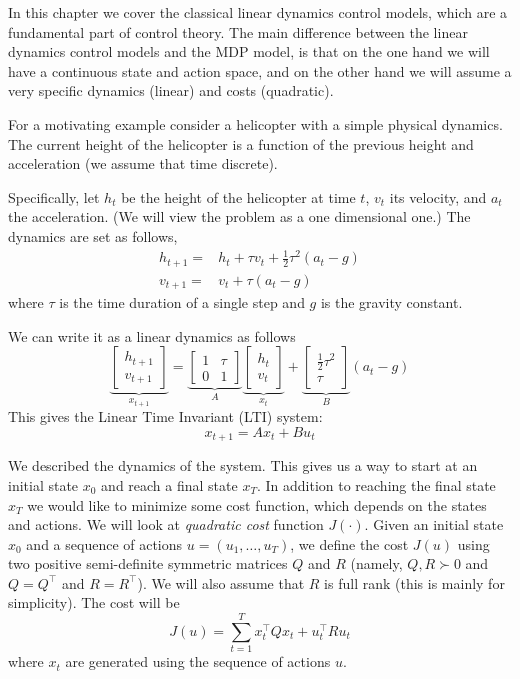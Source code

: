 In this chapter we cover the classical linear dynamics control models, which are a fundamental part of control theory. The main difference between the linear dynamics control models and the MDP model, is that on the one hand we will have a continuous state and action space, and on the other hand we will assume a very specific dynamics (linear) and costs (quadratic).

For a motivating example consider a helicopter with a simple
physical dynamics. The current height of the helicopter is a
function of the previous height and acceleration (we assume that time
discrete).

Specifically, let $h_t$ be the height of the helicopter at time $t$,
$v_t$ its velocity, and $a_t$ the acceleration. (We will view the
problem as a one dimensional one.) The dynamics are set as follows,
\begin{align*}
h_{t+1} =& h_t +\tau v_t +\frac{1}{2} \tau^2(a_t-g)\\
v_{t+1} = & v_t +\tau (a_t-g)
\end{align*}
where $\tau$ is the time duration of a single step and $g$ is the gravity constant.

We can write it as a linear dynamics as follows
\[
\underbrace{
\begin{bmatrix}
h_{t+1}\\
v_{t+1}
\end{bmatrix}}_{x_{t+1}}
= \underbrace{
\begin{bmatrix}
1&\tau\\
0&1
\end{bmatrix}
}_A
\underbrace{
\begin{bmatrix}
h_{t}\\
v_{t}
\end{bmatrix}
}_{x_t} +
\underbrace{\begin{bmatrix}
\frac{1}{2}\tau^2\\
\tau
\end{bmatrix}
}_B
(a_t-g)
\]
This gives the Linear Time Invariant (LTI) system:
\[
x_{t+1}=Ax_t+Bu_t
\]

We described the dynamics of the system. This gives us a way to
start at an initial state $x_0$ and reach a final state $x_T$. In
addition to reaching the final state $x_T$ we would like to minimize
some cost function, which depends on the states and actions. We will
look at {\em quadratic cost} function $J(\cdot)$. Given an initial
state $x_0$ and a sequence of actions $u=(u_1, \ldots , u_{T})$, we
define the cost $J(u)$ using two positive semi-definite symmetric matrices
$Q$ and $R$ (namely,  $Q,R \succ 0$ and $Q=Q^\top$ and $R=R^\top$). We will also assume that $R$ is full rank (this is mainly for simplicity).
The cost will be
\[
J(u)=\sum_{t=1}^T x_t^\top Q x_t + u_t^\top R u_t
\]
where $x_t$ are generated using the sequence of actions $u$.

